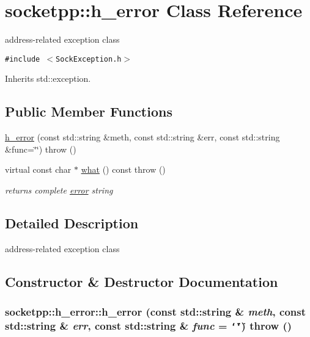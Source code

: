 \hypertarget{classsocketpp_1_1h__error}{
\section{socketpp::h\_\-error Class Reference}
\label{classsocketpp_1_1h__error}
}
address-related exception class  


{\tt \#include $<$SockException.h$>$}

Inherits std::exception.

\subsection*{Public Member Functions}
\begin{CompactItemize}
\item 
\hyperlink{classsocketpp_1_1h__error_c15a1c6216114250241349fdfcdeb98a}{h\_\-error} (const std::string \&meth, const std::string \&err, const std::string \&func=\char`\"{}\char`\"{})  throw ()
\item 
\hypertarget{classsocketpp_1_1h__error_055c1a5b55b5d02fe81fd74cb8b900d2}{
virtual const char $\ast$ \hyperlink{classsocketpp_1_1h__error_055c1a5b55b5d02fe81fd74cb8b900d2}{what} () const   throw ()}
\label{classsocketpp_1_1h__error_055c1a5b55b5d02fe81fd74cb8b900d2}

\begin{CompactList}\small\item\em returns complete \hyperlink{classsocketpp_1_1error}{error} string \item\end{CompactList}\end{CompactItemize}


\subsection{Detailed Description}
address-related exception class 

\subsection{Constructor \& Destructor Documentation}
\hypertarget{classsocketpp_1_1h__error_c15a1c6216114250241349fdfcdeb98a}{
\subsubsection[{h\_\-error}]{\setlength{\rightskip}{0pt plus 5cm}socketpp::h\_\-error::h\_\-error (const std::string \& {\em meth}, \/  const std::string \& {\em err}, \/  const std::string \& {\em func} = {\tt \char`\"{}\char`\"{}})  throw ()}}
\label{classsocketpp_1_1h__error_c15a1c6216114250241349fdfcdeb98a}


